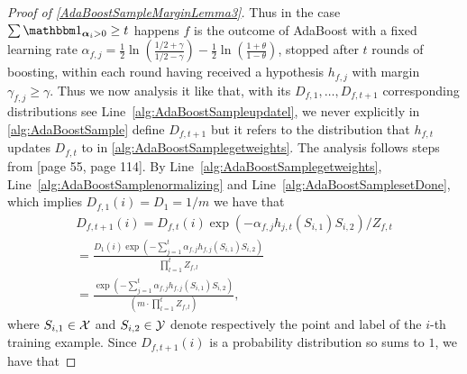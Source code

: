 \begin{proof}[Proof of \cref{AdaBoostSampleMarginLemma3}]
    Thus in the case $\sum \ind_{\alphar_i>0}\geq t$ happens $f$ is the outcome of AdaBoost with a fixed learning rate $\alpha_{f,j}=\frac{1}{2}\ln{\left(\frac{1/2+\gamma} {1/2-\gamma}\right)}-\frac{1}{2}\ln{(\frac{1+\theta}{1-\theta} )}$, stopped after $t$ rounds of boosting, within each round having received a hypothesis $ h_{f,j} $ with margin $ \gamma_{f,j}\geq \gamma$. Thus we now analysis it like that, with its $ D_{f,1},\ldots,D_{f,t+1} $ corresponding distributions see Line~\ref{alg:AdaBoostSampleupdatel}, we never explicitly in \cref{alg:AdaBoostSample} define $  D_{f,t+1}$ but it refers to the distribution that $ h_{f,t}$ updates $ D_{f,t} $ to in \cref{alg:AdaBoostSamplegetweights}. The analysis follows steps from \cite{boostingbookSchapireF12}[page 55, page 114]. By Line~\ref{alg:AdaBoostSamplegetweights}, Line~\ref{alg:AdaBoostSamplenormalizing} and Line~\ref{alg:AdaBoostSamplesetDone}, which implies $ D_{f,1}(i)=D_{1}=1/m $ we have that 
    \begin{align*}
      D_{f,t+1}(i)= D_{f,t}(i) \exp{(-\alpha_{f,j}h_{j,t}(S_{i,1})S_{i,2} )}/Z_{f,t} 
      \\
      =\frac{D_{1}(i)\exp{(- \sum_{j=1}^{t}\alpha_{f,j}h_{f,j}(S_{i,1})S_{i,2})}}{\prod_{l=1}^{t}Z_{f,l} }
      \\
      =\frac{\exp{( -\sum_{j=1}^{t}\alpha_{f,j}h_{f,j}(S_{i,1})S_{i,2})}}{(m\cdot\prod_{l=1}^{t}Z_{f,l})} ,
    \end{align*}
 where $ S_{i,1} \in \mathcal{X}$  and $S_{i,2}  \in\mathcal{Y}$ denote respectively the point and label of the $ i $-th training example. Since $ D_{f,t+1}(i) $ is a probability distribution so sums to $ 1 $, we have that 
 

\end{proof}
